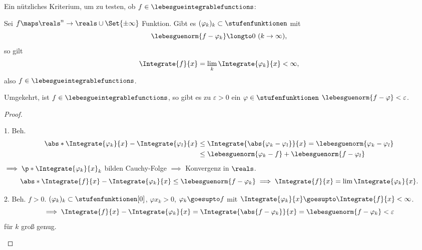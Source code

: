 Ein nützliches Kriterium, um zu testen, ob \(f\in \lebesgueintegrablefunctions\):

\begin{lemma}
    \label{kriterium_L1}
    Sei \(f\maps\reals^n\to\reals\cup\Set{\pm\infty}\) Funktion. Gibt es \((\varphi_k)_k\subset\stufenfunktionen\) mit 
    \begin{equation*}
        \lebesguenorm{f-\varphi_k}\longto 0\ (k\to\infty),
    \end{equation*}
    so gilt 
    \begin{equation*}
        \Integrate{ f}{x}=\lim_k\Integrate{ \varphi_k}{x}<\infty,
    \end{equation*}
    also \(f\in \lebesgueintegrablefunctions\).

    Umgekehrt, ist \(f\in \lebesgueintegrablefunctions\), so gibt es zu \(\varepsilon>0\) ein \(\varphi\in\stufenfunktionen\) \sd \(\lebesguenorm{f-\varphi}<\varepsilon\).
\end{lemma}

\begin{proof}
  \begin{proofdescription}
    \item{1. Beh.} 
    \begin{align*}
        \abs*{\Integrate{\varphi_k}{x}-\Integrate{\varphi_l}{x}} &\leq\Integrate{\abs{\varphi_k-\varphi_l}}{x} = \lebesguenorm{\varphi_k-\varphi_l}\\
        &\leq \lebesguenorm{\varphi_k-f}+\lebesguenorm{f-\varphi_l}
    \end{align*}
    \(\implies\p*{\Integrate{\varphi_k}{x}}_k\) bilden Cauchy-Folge \(\implies\) Konvergenz in \( \reals \).
    \begin{equation*}
      \abs*{\Integrate{f}{x}-\Integrate{\varphi_k}{x}}\leq \lebesguenorm{f-\varphi_k}\implies \Integrate{f}{x}=\lim \Integrate{\varphi_k}{x}.
    \end{equation*}

    \item{2. Beh.} \Obda \(f> 0\).
    \texists \((\varphi_k)_k\subset\stufenfunktionen[0]\), \( \varphi x_k> 0\), \( \varphi_k\goesupto f\) mit \(\Integrate{\varphi_k}{x}\goesupto\Integrate{f}{x}<\infty\).
    \begin{equation*}
        \implies \Integrate{ f}{x}-\Integrate{\varphi_k}{x}=\Integrate{\abs{f-\varphi_k}}{x}=\lebesguenorm{f-\varphi_k}< \varepsilon
    \end{equation*}
    für \(k\) groß genug.
  \end{proofdescription}
\end{proof}

